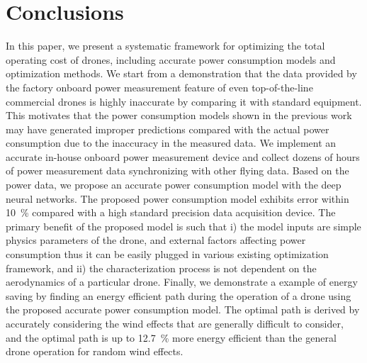 \documentclass[journal]{./template/IEEEtran}
\begin{document}
\section{Conclusions}

In this paper, we present a systematic framework for optimizing the total operating cost of drones, including accurate power consumption models and optimization methods.
We start from a demonstration that the data provided by the factory onboard power measurement feature of even top-of-the-line commercial drones is highly inaccurate by comparing it with standard equipment. 
This motivates that the power consumption models shown in the previous work may have generated improper predictions compared with the actual power consumption due to the inaccuracy in the measured data.
We implement an accurate in-house onboard power measurement device and collect dozens of hours of power measurement data synchronizing with other flying data. 
Based on the power data, we propose an accurate power consumption model with the deep neural networks. 
The proposed power consumption model exhibits error within 10~\% compared with a high standard precision data acquisition device. 
The primary benefit of the proposed model is such that i) the model inputs are simple physics parameters of the drone, and external factors affecting power consumption thus it can be easily plugged in various existing optimization framework, and ii) the characterization process is not dependent on the aerodynamics of a particular drone. %
Finally, we demonstrate a example of energy saving by finding an energy efficient path during the operation of a drone using the proposed accurate power consumption model. The optimal path is derived by accurately considering the wind effects that are generally difficult to consider, and the optimal path is up to 12.7~\% more energy efficient than the general drone operation for random wind effects.








\end{document}
